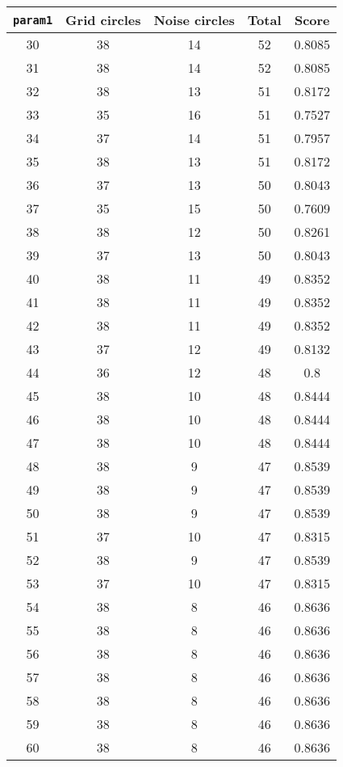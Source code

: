 \documentclass[letterpaper, 12pt]{article}
\begin{document}
\begin{longtable}{|c|c|c|c|c|}
\hline
\textbf{\texttt{param1}} & \textbf{Grid circles} & \textbf{Noise circles} & \textbf{Total} & \textbf{Score} \\
\hline
30 & 38 & 14 & 52 & 0.8085 \\
\hline
31 & 38 & 14 & 52 & 0.8085 \\
\hline
32 & 38 & 13 & 51 & 0.8172 \\
\hline
33 & 35 & 16 & 51 & 0.7527 \\
\hline
34 & 37 & 14 & 51 & 0.7957 \\
\hline
35 & 38 & 13 & 51 & 0.8172 \\
\hline
36 & 37 & 13 & 50 & 0.8043 \\
\hline
37 & 35 & 15 & 50 & 0.7609 \\
\hline
38 & 38 & 12 & 50 & 0.8261 \\
\hline
39 & 37 & 13 & 50 & 0.8043 \\
\hline
40 & 38 & 11 & 49 & 0.8352 \\
\hline
41 & 38 & 11 & 49 & 0.8352 \\
\hline
42 & 38 & 11 & 49 & 0.8352 \\
\hline
43 & 37 & 12 & 49 & 0.8132 \\
\hline
44 & 36 & 12 & 48 & 0.8 \\
\hline
45 & 38 & 10 & 48 & 0.8444 \\
\hline
46 & 38 & 10 & 48 & 0.8444 \\
\hline
47 & 38 & 10 & 48 & 0.8444 \\
\hline
48 & 38 & 9 & 47 & 0.8539 \\
\hline
49 & 38 & 9 & 47 & 0.8539 \\
\hline
50 & 38 & 9 & 47 & 0.8539 \\
\hline
51 & 37 & 10 & 47 & 0.8315 \\
\hline
52 & 38 & 9 & 47 & 0.8539 \\
\hline
53 & 37 & 10 & 47 & 0.8315 \\
\hline
54 & 38 & 8 & 46 & 0.8636 \\
\hline
55 & 38 & 8 & 46 & 0.8636 \\
\hline
56 & 38 & 8 & 46 & 0.8636 \\
\hline
57 & 38 & 8 & 46 & 0.8636 \\
\hline
58 & 38 & 8 & 46 & 0.8636 \\
\hline
59 & 38 & 8 & 46 & 0.8636 \\
\hline
60 & 38 & 8 & 46 & 0.8636 \\

\end{longtable}
\end{document}
